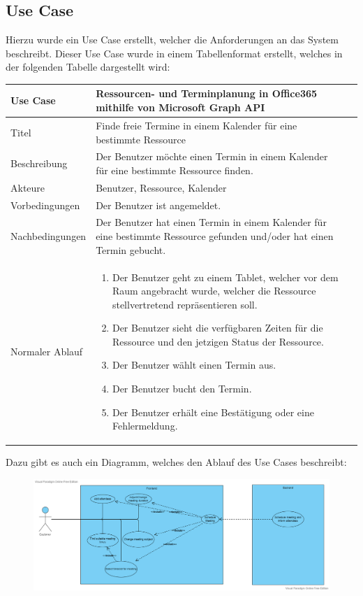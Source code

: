 \subsection{Use Case}\label{subsec:use-case}
Hierzu wurde ein Use Case erstellt, welcher die Anforderungen an das System beschreibt.
Dieser Use Case wurde in einem Tabellenformat erstellt, welches in der folgenden Tabelle dargestellt wird:
\newline
\begin{tabularx}{\textwidth}[b]{|l*{2}{|X}|}\hline
    \caption{Use Case - Terminbuchung}
    \label{tab:Terminbuchung}
    Use Case & Ressourcen- und Terminplanung in Office365 mithilfe von Microsoft Graph API\\
    \hline
    Titel & Finde freie Termine in einem Kalender für eine bestimmte Ressource\\
    \hline
    Beschreibung & Der Benutzer möchte einen Termin in einem Kalender für eine bestimmte Ressource finden.\\
    \hline
    Akteure & Benutzer, Ressource, Kalender\\
    \hline
    Vorbedingungen & Der Benutzer ist angemeldet.\\
    \hline
    Nachbedingungen & Der Benutzer hat einen Termin in einem Kalender für eine bestimmte Ressource gefunden und/oder hat einen Termin gebucht.\\
    \hline
    Normaler Ablauf & \begin{enumerate}
        \item Der Benutzer geht zu einem Tablet, welcher vor dem Raum angebracht wurde, welcher die Ressource stellvertretend repräsentieren soll.
        \item Der Benutzer sieht die verfügbaren Zeiten für die Ressource und den jetzigen Status der Ressource.
        \item Der Benutzer wählt einen Termin aus.
        \item Der Benutzer bucht den Termin.
        \item Der Benutzer erhält eine Bestätigung oder eine Fehlermeldung.
    \end{enumerate}\\
    \hline
\end{tabularx}
\newline
\newline
Dazu gibt es auch ein Diagramm, welches den Ablauf des Use Cases beschreibt:
\newline
\newline
\begin{figure}[h]
\par\vspace{1cm}
\centering
\includegraphics[width=\textwidth]{Bilder/Objektorientiertes Design/Use Case diagram ressource booking}
\end{figure}
\justifying
\newline
\newline
